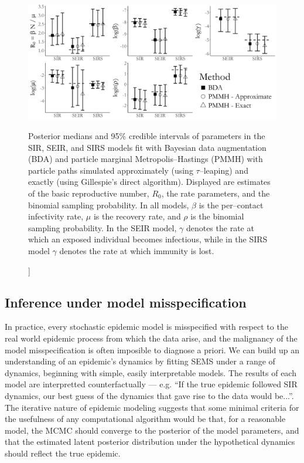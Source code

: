 \begin{figure}[!h]
	\centering
	\includegraphics[width=\linewidth]{figures/sim1_credints.pdf}
	\caption[Posterior estimates of SIR, SEIR, and SIRS model parameters fit to simualted data using Bayesian data augmentation and PMMH.]]{Posterior medians and 95\% credible intervals of parameters in the SIR, SEIR, and SIRS models fit with Bayesian data augmentation (BDA) and particle marginal Metropolis--Hastings (PMMH) with particle paths simulated approximately (using $ \tau $--leaping) and exactly (using Gillespie's direct algorithm). Displayed are estimates of the basic reproductive number, $ R_0 $, the rate parameters, and the binomial sampling probability. In all models, $ \beta $ is the per--contact infectivity rate, $ \mu $ is the recovery rate, and $ \rho $ is the binomial sampling probability. In the SEIR model, $ \gamma $ denotes the rate at which an exposed individual becomes infectious, while in the SIRS model $ \gamma $ denotes the rate at which immunity is lost.}
	\label{fig:sim1_credint}
\end{figure}

\subsection{Inference under model misspecification}
\label{subsec:bda_misspec_sim}
In practice, every stochastic epidemic model is misspecified with respect to the real world epidemic process from which the data arise, and the malignancy of the model misspecification is often imposible to diagnose a priori. We can build up an understanding of an epidemic's dynamics by fitting SEMS under a range of dynamics, beginning with simple, easily interpretable models. The results of each model are interpretted counterfactually --- e.g. ``If the true epidemic followed SIR dynamics, our best guess of the dynamics that gave rise to the data would be...''. The iterative nature of epidemic modeling suggests that some minimal criteria for the usefulness of any computational algorithm would be that, for a reasonable model, the MCMC should converge to the posterior of the model parameters, and that the estimated latent posterior distribution under the hypothetical dynamics should reflect the true epidemic.

